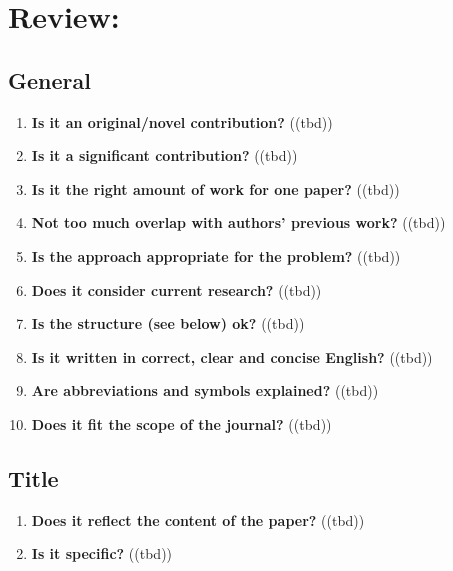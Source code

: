 
\chapter*{Review: \metaTitle}\minitoc\label{sec:review}\vspace{.5cm}
\setcounter{chapter}{1}
\noindent\lipsum[7]

\section{General}\label{sec:general}
\begin{enumerate}[resume]
    \item \textbf{Is it an original/novel contribution?} \textcolor{HighlightColor}{	\textcolor{HighlightColor}{((tbd))}}
    \item \textbf{Is it a significant contribution?} 	\textcolor{HighlightColor}{((tbd))}
    \item \textbf{Is it the right amount of work for one paper?} 	\textcolor{HighlightColor}{((tbd))}
    \item \textbf{Not too much overlap with authors’ previous work?} 	\textcolor{HighlightColor}{((tbd))}
    \item \textbf{Is the approach appropriate for the problem?} 	\textcolor{HighlightColor}{((tbd))}
    \item \textbf{Does it consider current research?} 	\textcolor{HighlightColor}{((tbd))}
    \item \textbf{Is the structure (see below) ok?} 	\textcolor{HighlightColor}{((tbd))}
    \item \textbf{Is it written in correct, clear and concise English?} 	\textcolor{HighlightColor}{((tbd))}
    \item \textbf{Are abbreviations and symbols explained?} 	\textcolor{HighlightColor}{((tbd))}
    \item \textbf{Does it fit the scope of the journal?} 	\textcolor{HighlightColor}{((tbd))}
\end{enumerate}

\section{Title}\label{sec:title}
\begin{enumerate}[resume]
    \item \textbf{Does it reflect the content of the paper?} 	\textcolor{HighlightColor}{((tbd))}
    \item \textbf{Is it specific?} 	\textcolor{HighlightColor}{((tbd))}
\end{enumerate}

